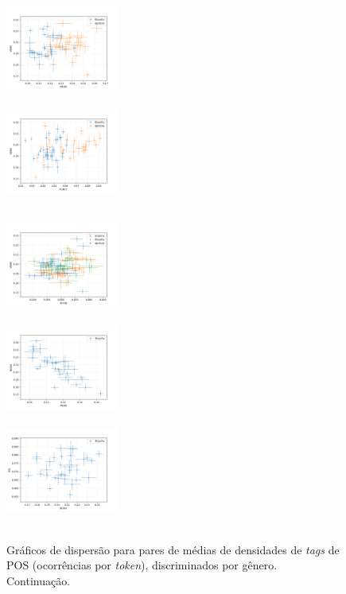 \documentclass[10pt,a4paper,onecolumn]{article}
\theoremstyle{definition}
\theoremstyle{remark}
\begin{document}
\begin{figure}[htpb!]
\begin{multicols}{3}
		\includegraphics[width=0.33\textwidth]{graficos/VERB_x_PRON.png} \\  \\
		\includegraphics[width=0.33\textwidth]{graficos/VERB_x_PUNCT.png} \\  \\
	\end{multicols}\vspace{-0.8cm}
	\begin{multicols}{3}
		\includegraphics[width=0.33\textwidth]{graficos/VERB_x_SCONJ.png} \\  \\
		\includegraphics[width=0.33\textwidth]{graficos/NOUN_x_PRON.png} \\  \\
		\includegraphics[width=0.33\textwidth]{graficos/ADJ_x_NOUN.png} \\  \\
	\end{multicols}\vspace{-0.5cm}
	\caption{Gráficos de dispersão para pares de médias de densidades de \emph{tags} de POS (ocorrências por \emph{token}), discriminados por gênero. Continuação.}
	\label{fig:dispersoes2}
\end{figure}
\end{document}
